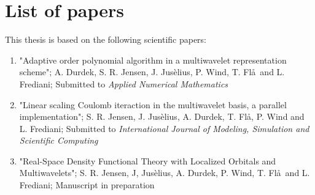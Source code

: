 \chapter*{List of papers}
This thesis is based on the following scientific papers:
\begin{enumerate}[I]
    \item "Adaptive order polynomial algorithm in a multiwavelet representation scheme";
	A. Durdek, S. R. Jensen, J. Jus\`{e}lius, P. Wind, T. Fl\aa \ and L. Frediani;
	Submitted to \emph{Applied Numerical Mathematics}
    \item "Linear scaling Coulomb iteraction in the multiwavelet basis, a parallel implementation";
	S. R. Jensen, J. Jus\`{e}lius, A. Durdek, T. Fl\aa, P. Wind and L. Frediani;
	Submitted to \emph{International Journal of Modeling, Simulation and Scientific Computing}
    \item "Real-Space Density Functional Theory with Localized Orbitals and Multiwavelets";
	S. R. Jensen, J, Jus\`{e}lius, A. Durdek, P. Wind, T. Fl\aa \ and L. Frediani;
	Manuscript in preparation
\end{enumerate}
